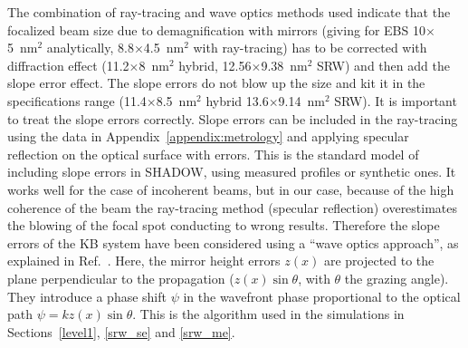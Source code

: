 \documentclass{iucr}              %
\begin{document}
The combination of ray-tracing and wave optics methods used indicate that the focalized beam size due to  demagnification with mirrors (giving for EBS 10$\times$5~nm$^2$ analytically, 8.8$\times$4.5~nm$^2$ with ray-tracing) has to be corrected with diffraction effect (11.2$\times$8~nm$^2$ hybrid, 12.56$\times$9.38~nm$^2$ SRW) and then add the slope error effect. The slope errors do not blow up the size and kit it in the specifications range (11.4$\times$8.5~nm$^2$ hybrid 13.6$\times$9.14~nm$^2$ SRW). It is important to treat the slope errors correctly. Slope errors can be included in the ray-tracing using the data in Appendix~\ref{appendix:metrology} and applying specular reflection on the optical surface with errors. This is the standard model of including slope errors in SHADOW, using measured profiles or synthetic ones. It works well for the case of incoherent beams, but in our case, because of the high coherence of the beam the ray-tracing method (specular reflection) overestimates the blowing of the focal spot conducting to wrong results. Therefore the slope errors of the KB system have been considered using a ``wave optics approach'', as explained in Ref.~\cite{hybrid}. Here, the mirror height errors $z(x)$ are projected to the plane perpendicular to the propagation ($z(x) \sin \theta$, with $\theta$ the grazing angle). They introduce a phase shift $\psi$ in the wavefront phase proportional to the optical path $\psi = k z(x) \sin \theta $. This is the algorithm used in the simulations in Sections~\ref{level1}, \ref{srw_se} and \ref{srw_me}.   


\end{document}
